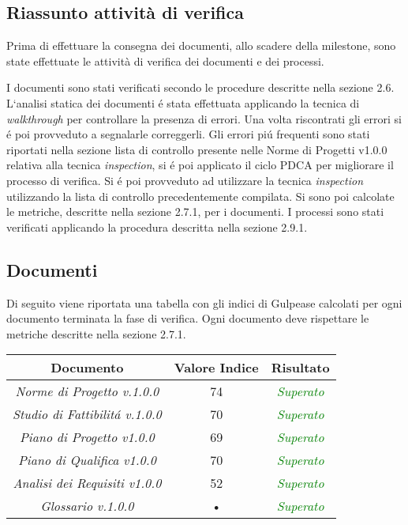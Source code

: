 \subsection{Riassunto attività di verifica}

Prima di effettuare la consegna dei documenti, allo scadere della milestone, sono state effettuate le attività di verifica dei documenti e dei processi.

I documenti sono stati verificati secondo le procedure descritte nella sezione 2.6.
L`analisi statica dei documenti \'e stata effettuata applicando la tecnica di \textit{walkthrough} per controllare la presenza di errori. Una volta riscontrati gli errori si \'e poi provveduto a segnalarle correggerli. Gli errori pi\'u frequenti sono stati riportati nella sezione lista di controllo presente nelle Norme di Progetti v1.0.0 relativa alla tecnica \textit{inspection}, si \'e poi applicato il ciclo PDCA per migliorare il processo di verifica.
Si \'e poi provveduto ad utilizzare la tecnica \textit{inspection} utilizzando la lista di controllo precedentemente compilata.
Si sono poi calcolate le metriche, descritte nella sezione 2.7.1, per i documenti.
I processi sono stati verificati applicando la procedura descritta nella sezione 2.9.1.

\subsection{Documenti}

Di seguito viene riportata una tabella con gli indici di Gulpease calcolati per ogni documento terminata la fase di verifica.
Ogni documento deve rispettare le metriche descritte nella sezione 2.7.1.\\

\hspace{1cm}

\begin{center}
\begin{tabular}{|c|c|c|}
\hline 
\textbf{Documento} & \textbf{Valore Indice} & \textbf{Risultato} \\ 
\hline
\textit{Norme di Progetto v.1.0.0} & 74 & \textcolor{green}{\textit{Superato}} \\ 
\textit{Studio di Fattibilit\'a v.1.0.0} & 70 & \textcolor{green}{\textit{Superato}} \\ 
\textit{Piano di Progetto v1.0.0} & 69 & \textcolor{green}{\textit{Superato}} \\ 
\textit{Piano di Qualifica v1.0.0} & 70 & \textcolor{green}{\textit{Superato}} \\ 
\textit{Analisi dei Requisiti v1.0.0} & 52 & \textcolor{green}{\textit{Superato}} \\ 
\textit{Glossario v.1.0.0} & • & \textcolor{green}{\textit{Superato}} \\ 
\hline 
\end{tabular}

\end{center}